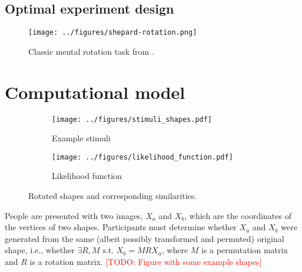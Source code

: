 \documentclass{article} %
\newcommand{\TODO}[1]{\textcolor{red}{[TODO: #1]}}
\begin{document}
\subsection{Optimal experiment design}


\begin{figure}[t]
  \centering
  \texttt{[image: ../figures/shepard-rotation.png]}
  \caption{Classic mental rotation task from \cite{Shepard1971}.}
  \label{fig:mental-rotation}
\end{figure}

\section{Computational model}

\begin{figure}[t]
  \centering
  \begin{subfigure}[b]{0.45\textwidth}
    \centering
    \texttt{[image: ../figures/stimuli\_shapes.pdf]}
    \vspace{0pt}
    \caption{Example stimuli}
    \label{fig:stimuli}
  \end{subfigure}
  \begin{subfigure}[b]{0.45\textwidth}
    \centering
    \texttt{[image: ../figures/likelihood\_function.pdf]}
    \caption{Likelihood function}
    \label{fig:likelihood}
  \end{subfigure}
  \caption{Rotated shapes and corresponding similarities.}
\end{figure}

People are presented with two images, $X_a$ and $X_b$, which are the
coordinates of the vertices of two shapes. Participants must determine
whether $X_a$ and $X_b$ were generated from the same (albeit possibly
transformed and permuted) original shape, i.e., whether $\exists
R,M\textrm{ s.t. } X_b=MRX_a$, where $M$ is a permutation matrix and
$R$ is a rotation matrix. \TODO{Figure with some example shapes}
\end{document}
